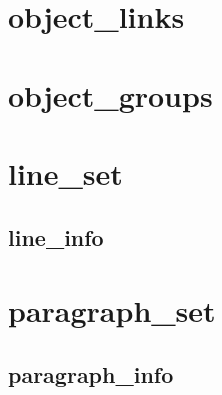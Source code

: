 \documentclass[a4]{book}
\begin{document}
\section{object\_links}

\section{object\_groups}



\section{line\_set}

\subsection{line\_info}




\section{paragraph\_set}

\subsection{paragraph\_info}
\end{document}
